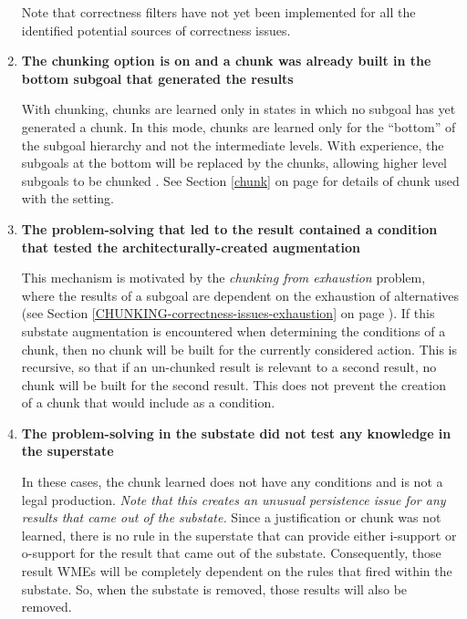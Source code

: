 \begin{enumerate}
	Note that correctness filters have not yet been implemented for all the identified potential sources of correctness issues.

	\item \textbf{The chunking option  is on and a chunk was already built in the bottom subgoal that generated the results}

	With  chunking, chunks are learned only in states in which no subgoal has yet generated a chunk. In this mode, chunks are learned only for the ``bottom'' of the subgoal hierarchy and not the intermediate levels. With experience, the subgoals at the bottom will be replaced by the chunks, allowing higher level subgoals to be chunked .  See Section \ref{chunk} on page \pageref{chunk} for details of chunk used with the  setting.

	\item \textbf{The problem-solving that led to the result contained a condition that tested the architecturally-created  augmentation}

	This mechanism is motivated by the \textit{chunking from exhaustion} problem, where the results of a subgoal are dependent on the exhaustion of alternatives (see Section \ref{CHUNKING-correctness-issues-exhaustion} on page \pageref{CHUNKING-correctness-issues-exhaustion}). If this substate augmentation is encountered when determining the conditions of a chunk, then no chunk will be built for the currently considered action. This is recursive, so that if an un-chunked result is relevant to a second result, no chunk will be built for the second result. This does not prevent the creation of a chunk that would include  as a condition.

	\item \textbf{The problem-solving in the substate did not test any knowledge in the superstate}

	In these cases, the chunk learned does not have any conditions and is not a legal production.  \emph{Note that this creates an unusual persistence issue for any results that came out of the substate.}  Since a justification or chunk was not learned, there is no rule in the superstate that can provide either i-support or o-support for the result that came out of the substate.   Consequently, those result WMEs will be completely dependent on the rules that fired within the substate.  So, when the substate is removed, those results will also be removed.
\end{enumerate}


